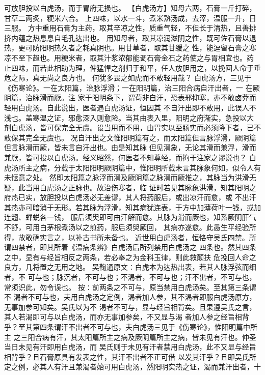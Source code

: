 \documentclass[a4paper,12pt,UTF8,twoside]{ctexbook}
\begin{document}
可放胆投以白虎汤，而于胃府无损也。 
【白虎汤方】知母六两，石膏一斤打碎，甘草二两炙，粳米六合。 
上四味，以水一斗，煮米熟汤成，去滓，温服一升，日三服。 
方中重用石膏为主药，取其辛凉之性，质重气轻，不但长于清热，且善排挤内蕴之热息息自毛孔达出也。 
用知母者，取其凉润滋阴之性，既可佐石膏以退热，更可防阳明热久者之耗真阴也。用甘草者，取其甘缓之 
性，能逗留石膏之寒凉不至下趋也。用粳米者，取其汁浆浓郁能调石膏金石之药使之与胃相宜也。药 
止四味，而若此相助为理，俾猛悍之剂归于和平，任人放胆用之，以挽回人命于垂危之际，真无尚之良方也。 
何犹多畏之如虎而不敢轻用哉？ 
白虎汤方，三见于《伤寒论》。一在太阳篇，治脉浮滑；一在阳明篇，治三阳合病自汗出者，一 
在厥阴篇，治脉滑而厥。注 
家于阳明条下，谓苟非自汗，恐表邪抑塞，亦不敢卤莽而轻用白虎汤。自此说出，医者遇白虎汤证，恒因其 
不自汗出即不敢用，此误人不浅也。盖寒温之证，邪愈深入则愈险。当其由表入里，阳明之府渐实，急投以大 
剂白虎汤，皆可保完全无虞。设当用而不用，由胃实以至肠实而必须降下者，已不敢保其完全无虞也。 
况自汗出之文惟阳明篇有之，而太阳篇但言脉浮滑，厥阴篇但言脉滑而厥，皆未言自汗出也。由是知其脉 
但见滑象，无论其滑而兼浮，滑而兼厥，皆可投以白虎汤。经义昭然，何医者不知尊经，而拘于注家之谬说也？ 
白虎汤所主之病，分载于太阳阳明厥阴篇中，惟阳明所载未言其脉象何如，似令人有未惬意之处。 
然即太阳篇之脉浮而滑及厥阴篇之脉滑而厥推之，其脉当为洪滑无疑，此当用白虎汤之正脉也。故治伤寒者，临 
证时若见其脉象洪滑，知其阳明之府热已实，放胆投以白虎汤必无差谬，其人将药服后，或出凉汗而愈，或 
不出汗其热亦可暗消于无形。若其脉为浮滑，知其病犹连表，于方中加薄荷叶一钱，或加连翘、蝉蜕各一钱， 
服后须臾即可由汗解而愈。其脉为滑而厥也，知系厥阴肝气不舒，可用白茅根煮汤以之煎药，服后须臾厥回， 
其病亦遂愈。此愚生平经验所得，故敢确实言之，以补古书所未备也。 
近世用白虎汤者，恒恪守吴氏四禁。所谓四禁者，即其所着《温病条辨》白虎汤后所列禁用白虎汤之 
四条也。然其四条之中，显有与经旨相反之两条，若必奉之为金科玉律，则此救颠扶 
危挽回人命之良方，几将置之无用之地。 
吴鞠通原文∶白虎本为达热出表，若其人脉浮弦而细者，不 
可与也；脉沉者，不可与也；不渴者，不可与也；汗不出者，不可与也，常须识此，勿令误也。 
按∶前两条之不可与，原当禁用白虎汤矣。至其第三条谓不 
渴者不可与也，夫用白虎汤之定例，渴者加人参，其不渴者即服白虎汤原方，无事加参可知矣。吴氏以为不 
渴者不可与，显与经旨相背矣。且果遵吴氏之言，其人若渴即可与以白虎汤，而亦无事加参矣，不又显与渴 
者加人参之经旨相背乎？至其第四条谓汗不出者不可与也，夫白虎汤三见于《伤寒论》，惟阳明篇中所主 
之三阳合病有汗，其太阳篇所主之病及厥阴篇所主之病，皆未见有汗也。仲圣当日未见有汗即用白虎汤，而 
吴氏则于未见有汗者禁用白虎汤，此不又显与经旨相背乎？且石膏原具有发表之性，其汗不出者不正可借 
以发其汗乎？且即吴氏所定之例，必其人有汗且兼渴者始可用白虎汤，然阳明实热之证，渴而兼汗出者，十 
\end{document}
